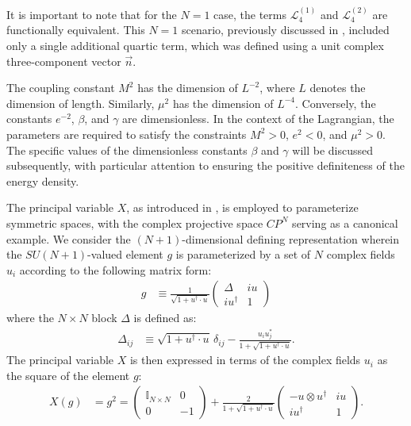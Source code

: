 \documentclass[aps,prd,superscriptaddress,notitlepage,11pt,final,longbibliography,nofootinbib]{revtex4-1}
\numberwithin{equation}{section}
\begin{document}
It is important to note that for the $N=1$ case, the terms $\mathcal{L}_4^{(1)}$ and $\mathcal{L}_4^{(2)}$ are functionally equivalent. This $N=1$ scenario, previously discussed in \cite{Ferreira:2008nn}, included only a single additional quartic term, which was defined using a unit complex three-component vector $\vec{n}$.

The coupling constant $M^2$ has the dimension of $L^{-2}$, where $L$ denotes the dimension of length. Similarly, $\mu^2$ has the dimension of $L^{-4}$. Conversely, the constants $e^{-2}$, $\beta$, and $\gamma$ are dimensionless. In the context of the Lagrangian, the parameters are required to satisfy the constraints $M^2>0$, $e^2<0$, and $\mu^2>0$. The specific values of the dimensionless constants $\beta$ and $\gamma$ will be discussed subsequently, with particular attention to ensuring the positive definiteness of the energy density.


The principal variable $X$, as introduced in \cite{EICHENHERR1980528, Ferreira:1984bi}, is employed to parameterize symmetric spaces, with the complex projective space $CP^N$ serving as a canonical example. We consider the $(N+1)$-dimensional defining representation wherein the $SU(N+1)$-valued element $g$ is parameterized by a set of $N$ complex fields $u_i$ according to the following matrix form:
\begin{align}
g&\equiv\frac{1}{\sqrt{1+u^{\dagger} \cdot u}}\left(\begin{array}{cc}
\Delta&iu\\
iu^{\dagger}&1
\end{array}\right)\label{parametryzacja}
\end{align}
where the $N \times N$ block $\Delta$ is defined as:
\begin{align}
\Delta_{ij}&\equiv \sqrt{1+u^{\dagger} \cdot u}\,\delta_{ij}-\frac{u_iu_j^*}{1+\sqrt{1+u^{\dagger} \cdot u}}.
\end{align}
The principal variable $X$ is then expressed in terms of the complex fields $u_i$ as the square of the element $g$:
\begin{align}
X(g)&=g^2=
\left(\begin{array}{cc}
{\mathbb{I}}_{N\times N} & 0 \nonumber \\
0 & -1 \nonumber 
\end{array}\right)
+
\frac{2}{1+\sqrt{1+u^{\dagger} \cdot u}}\left(\begin{array}{cc}
-u\otimes u^\dagger & iu \nonumber \\
iu^\dagger & 1  
\end{array}\right).
\end{align}
\end{document}
